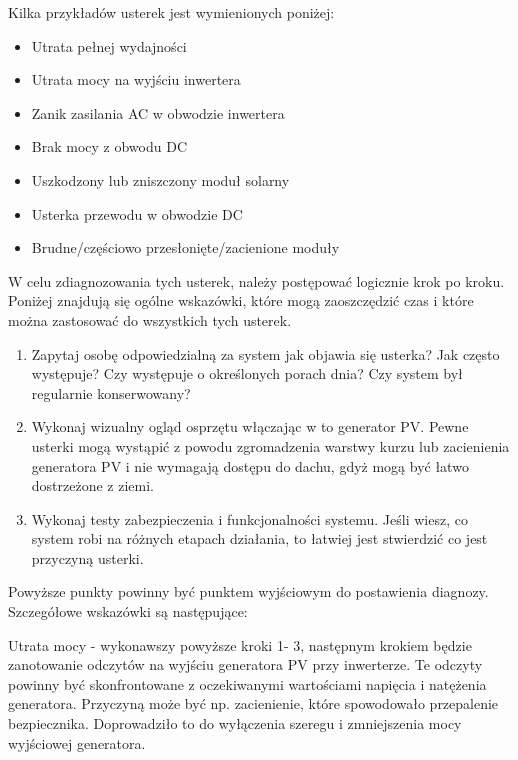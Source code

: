 \documentclass[12pt,a4paper]{article}
\begin{document}
Kilka przykładów usterek jest wymienionych poniżej: 

\begin{itemize}
\item Utrata pełnej wydajności 
\item Utrata mocy na wyjściu inwertera 
\item Zanik zasilania AC w obwodzie inwertera 
\item Brak mocy z obwodu DC 
\item Uszkodzony lub zniszczony moduł solarny 
\item Usterka przewodu w obwodzie DC 
\item Brudne/częściowo przesłonięte/zacienione moduły 
\end{itemize}
 

W celu zdiagnozowania tych usterek, należy postępować logicznie krok po 
kroku. Poniżej znajdują się ogólne wskazówki, które mogą zaoszczędzić 
czas i które można zastosować do wszystkich tych usterek. 


\begin{enumerate}
\item Zapytaj osobę odpowiedzialną za system jak objawia się usterka? 
Jak często występuje? Czy występuje o określonych porach dnia? Czy 
system był regularnie konserwowany? 
\item Wykonaj wizualny ogląd osprzętu włączając w to generator PV. Pewne 
usterki mogą wystąpić z powodu zgromadzenia warstwy kurzu lub 
zacienienia generatora PV i nie wymagają dostępu do dachu, gdyż mogą być 
łatwo dostrzeżone z ziemi. 
\item Wykonaj testy zabezpieczenia i funkcjonalności systemu. Jeśli 
wiesz, co system robi na różnych etapach działania, to łatwiej jest stwierdzić co jest przyczyną usterki. 

\end{enumerate}

 

Powyższe punkty powinny być punktem wyjściowym do postawienia diagnozy. 
Szczegółowe wskazówki są następujące: 

 

Utrata mocy - wykonawszy powyższe kroki 1- 3, następnym krokiem będzie 
zanotowanie odczytów na wyjściu generatora PV przy inwerterze. Te 
odczyty powinny być skonfrontowane z oczekiwanymi wartościami napięcia i 
natężenia generatora. Przyczyną może być np. zacienienie, które 
spowodowało przepalenie bezpiecznika. Doprowadziło to do wyłączenia 
szeregu i zmniejszenia mocy wyjściowej generatora. 
\end{document}
